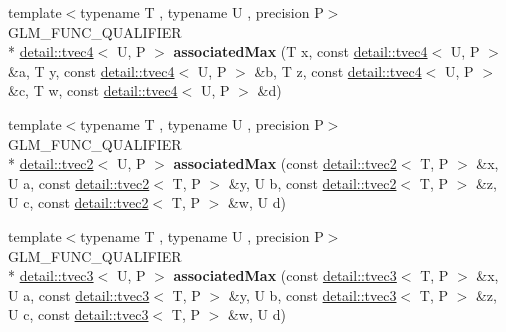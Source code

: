 \begin{DoxyCompactItemize}
\item 
\hypertarget{namespaceglm_ac1775bef23dce24ccc58b4d28ebedfe5}{{\footnotesize template$<$typename T , typename U , precision P$>$ }\\G\-L\-M\-\_\-\-F\-U\-N\-C\-\_\-\-Q\-U\-A\-L\-I\-F\-I\-E\-R \\*
\hyperlink{structglm_1_1detail_1_1tvec4}{detail\-::tvec4}$<$ U, P $>$ {\bfseries associated\-Max} (T x, const \hyperlink{structglm_1_1detail_1_1tvec4}{detail\-::tvec4}$<$ U, P $>$ \&a, T y, const \hyperlink{structglm_1_1detail_1_1tvec4}{detail\-::tvec4}$<$ U, P $>$ \&b, T z, const \hyperlink{structglm_1_1detail_1_1tvec4}{detail\-::tvec4}$<$ U, P $>$ \&c, T w, const \hyperlink{structglm_1_1detail_1_1tvec4}{detail\-::tvec4}$<$ U, P $>$ \&d)}\label{namespaceglm_ac1775bef23dce24ccc58b4d28ebedfe5}

\item 
\hypertarget{namespaceglm_ac62eaf5209fc441ade50b87df43829c0}{{\footnotesize template$<$typename T , typename U , precision P$>$ }\\G\-L\-M\-\_\-\-F\-U\-N\-C\-\_\-\-Q\-U\-A\-L\-I\-F\-I\-E\-R \\*
\hyperlink{structglm_1_1detail_1_1tvec2}{detail\-::tvec2}$<$ U, P $>$ {\bfseries associated\-Max} (const \hyperlink{structglm_1_1detail_1_1tvec2}{detail\-::tvec2}$<$ T, P $>$ \&x, U a, const \hyperlink{structglm_1_1detail_1_1tvec2}{detail\-::tvec2}$<$ T, P $>$ \&y, U b, const \hyperlink{structglm_1_1detail_1_1tvec2}{detail\-::tvec2}$<$ T, P $>$ \&z, U c, const \hyperlink{structglm_1_1detail_1_1tvec2}{detail\-::tvec2}$<$ T, P $>$ \&w, U d)}\label{namespaceglm_ac62eaf5209fc441ade50b87df43829c0}

\item 
\hypertarget{namespaceglm_a42c7107a2243cd0a7eefb95a69c0c5c0}{{\footnotesize template$<$typename T , typename U , precision P$>$ }\\G\-L\-M\-\_\-\-F\-U\-N\-C\-\_\-\-Q\-U\-A\-L\-I\-F\-I\-E\-R \\*
\hyperlink{structglm_1_1detail_1_1tvec3}{detail\-::tvec3}$<$ U, P $>$ {\bfseries associated\-Max} (const \hyperlink{structglm_1_1detail_1_1tvec3}{detail\-::tvec3}$<$ T, P $>$ \&x, U a, const \hyperlink{structglm_1_1detail_1_1tvec3}{detail\-::tvec3}$<$ T, P $>$ \&y, U b, const \hyperlink{structglm_1_1detail_1_1tvec3}{detail\-::tvec3}$<$ T, P $>$ \&z, U c, const \hyperlink{structglm_1_1detail_1_1tvec3}{detail\-::tvec3}$<$ T, P $>$ \&w, U d)}\label{namespaceglm_a42c7107a2243cd0a7eefb95a69c0c5c0}


\end{DoxyCompactItemize}

